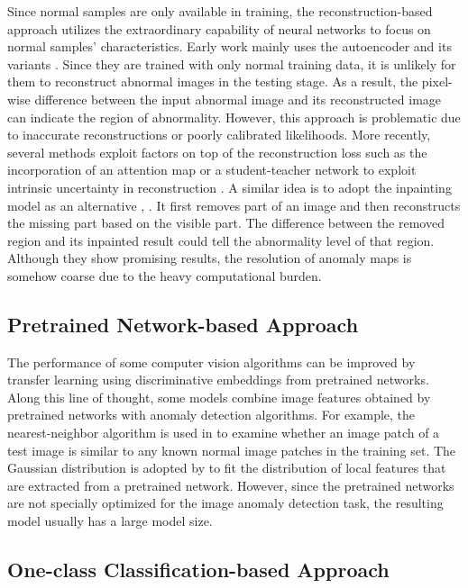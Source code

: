 \documentclass{article}
\begin{document}
Since normal samples are only available in training, the
reconstruction-based approach utilizes the extraordinary capability of
neural networks to focus on normal samples' characteristics. 
Early work mainly uses the autoencoder and its variants
\cite{DBLP:conf/visapp/BergmannLFSS19, salehi2020puzzle,
liu2020towards, rudolph2021same}. Since they are trained with only
normal training data, it is unlikely for them to reconstruct abnormal
images in the testing stage. As a result, the pixel-wise difference
between the input abnormal image and its reconstructed image can
indicate the region of abnormality. 
However, this approach is problematic due to inaccurate reconstructions
or poorly calibrated likelihoods.  More recently, several methods
exploit factors on top of the reconstruction loss such as the
incorporation of an attention map \cite{venkataramanan2020attention} or
a student-teacher network to exploit intrinsic uncertainty in
reconstruction \cite{bergmann2020uninformed}.  A similar idea is to
adopt the inpainting model as an alternative \cite{li2020superpixel},
\cite{zavrtanik2021reconstruction}. It first removes part of an image
and then reconstructs the missing part based on the visible part. The
difference between the removed region and its inpainted result could
tell the abnormality level of that region.  Although they show promising
results, the resolution of anomaly maps is somehow coarse due to the
heavy computational burden. 

\subsection{Pretrained Network-based Approach}\label{subsec:network}

The performance of some computer vision algorithms can be improved by
transfer learning using discriminative embeddings from pretrained
networks. Along this line of thought, some models combine image features
obtained by pretrained networks with anomaly detection algorithms.  For
example, the nearest-neighbor algorithm is used in \cite{cohen2020sub}
to examine whether an image patch of a test image is similar to any
known normal image patches in the training set. The Gaussian
distribution is adopted by \cite{rippel2020modeling} 
to fit the distribution of local features that
are extracted from a pretrained network.  However, since the pretrained
networks are not specially optimized for the image anomaly detection
task, the resulting model usually has a large model size. 

\subsection{One-class Classification-based Approach}\label{subsec:one-class}
\end{document}
